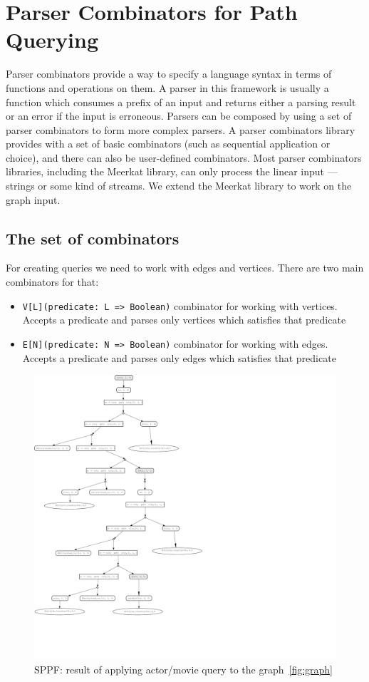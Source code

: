  \section{Parser Combinators for Path Querying}

Parser combinators provide a way to specify a language syntax in terms of functions and operations on them. 
A parser in this framework is usually a function which consumes a prefix of an input and returns either a parsing result or an error if the input is erroneous. 
Parsers can be composed by using a set of parser combinators to form more complex parsers. 
A parser combinators library provides with a set of basic combinators (such as sequential application or choice), and there can also be user-defined combinators. 
Most parser combinators libraries, including the Meerkat library, can only process the linear input --- strings or some kind of streams. 
We extend the Meerkat library to work on the graph input.


\subsection{The set of combinators}
For creating queries we need to work with edges and vertices. There are two main combinators for that:
\begin{itemize}
    \item \lstinline{V[L](predicate: L => Boolean)} combinator for working with vertices. Accepts a predicate and parses only vertices which satisfies that predicate
    \item \lstinline{E[N](predicate: N => Boolean)} combinator for working with edges. Accepts a predicate and parses only edges which satisfies that predicate  
\end{itemize}

\begin{figure}[h]
\includegraphics[scale=0.38]{sppf}
\caption{SPPF: result of applying actor/movie query to the graph~\ref{fig:graph}}
\label{fig:sppf}
\end{figure}

